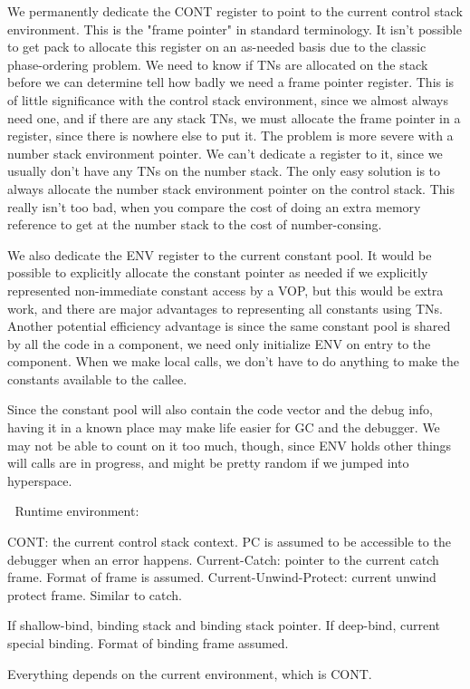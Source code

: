 {\begin{itemize, spread 0, spacing 1}
We permanently dedicate the CONT register to point to the current control stack
environment.  This is the "frame pointer" in standard terminology.  It isn't
possible to get pack to allocate this register on an as-needed basis due to the
classic phase-ordering problem.  We need to know if TNs are allocated on the
stack before we can determine tell how badly we need a frame pointer register.
This is of little significance with the control stack environment, since we
almost always need one, and if there are any stack TNs, we must allocate the
frame pointer in a register, since there is nowhere else to put it.  The
problem is more severe with a number stack environment pointer.  We can't
dedicate a register to it, since we usually don't have any TNs on the number
stack.  The only easy solution is to always allocate the number stack
environment pointer on the control stack.  This really isn't too bad, when you
compare the cost of doing an extra memory reference to get at the number stack
to the cost of number-consing.

We also dedicate the ENV register to the current constant pool.  It would be
possible to explicitly allocate the constant pointer as needed if we explicitly
represented non-immediate constant access by a VOP, but this would be extra
work, and there are major advantages to representing all constants using TNs.
Another potential efficiency advantage is since the same constant pool is
shared by all the code in a component, we need only initialize ENV on entry to
the component.  When we make local calls, we don't have to do anything to make
the constants available to the callee.

Since the constant pool will also contain the code vector and the debug info,
having it in a known place may make life easier for GC and the debugger.  We
may not be able to count on it too much, though, since ENV holds other things
will calls are in progress, and might be pretty random if we jumped into
hyperspace.


Runtime environment:

CONT: the current control stack context.
PC is assumed to be accessible to the debugger when an error happens.
Current-Catch: pointer to the current catch frame.  Format of frame is assumed.
Current-Unwind-Protect: current unwind protect frame.  Similar to catch.

If shallow-bind, binding stack and binding stack pointer.
If deep-bind, current special binding.  Format of binding frame assumed.

Everything depends on the current environment, which is CONT.



\end{itemize, spread 0, spacing 1}}
